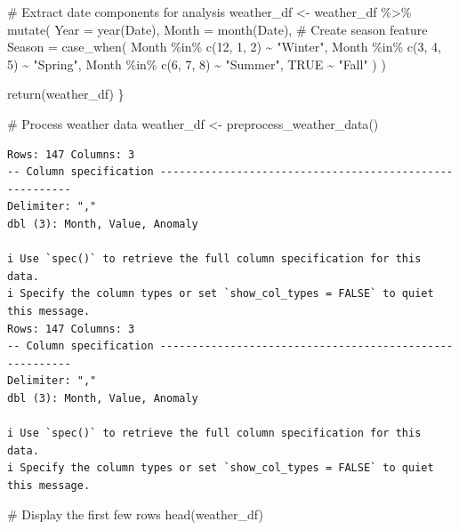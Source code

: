 \documentclass[
  letterpaper,
  DIV=11,
  numbers=noendperiod]{scrreprt}
\newenvironment{Shaded}{\begin{snugshade}}{\end{snugshade}}
\newcommand{\AttributeTok}[1]{\textcolor[rgb]{0.40,0.45,0.13}{#1}}
\newcommand{\CommentTok}[1]{\textcolor[rgb]{0.37,0.37,0.37}{#1}}
\newcommand{\ConstantTok}[1]{\textcolor[rgb]{0.56,0.35,0.01}{#1}}
\newcommand{\DecValTok}[1]{\textcolor[rgb]{0.68,0.00,0.00}{#1}}
\newcommand{\FunctionTok}[1]{\textcolor[rgb]{0.28,0.35,0.67}{#1}}
\newcommand{\NormalTok}[1]{\textcolor[rgb]{0.00,0.23,0.31}{#1}}
\newcommand{\OtherTok}[1]{\textcolor[rgb]{0.00,0.23,0.31}{#1}}
\newcommand{\SpecialCharTok}[1]{\textcolor[rgb]{0.37,0.37,0.37}{#1}}
\newcommand{\StringTok}[1]{\textcolor[rgb]{0.13,0.47,0.30}{#1}}
\begin{document}
\begin{Shaded}
\begin{Highlighting}[]
  \CommentTok{\# Extract date components for analysis}
\NormalTok{  weather\_df }\OtherTok{\textless{}{-}}\NormalTok{ weather\_df }\SpecialCharTok{\%\textgreater{}\%}
    \FunctionTok{mutate}\NormalTok{(}
      \AttributeTok{Year =} \FunctionTok{year}\NormalTok{(Date),}
      \AttributeTok{Month =} \FunctionTok{month}\NormalTok{(Date),}
      \CommentTok{\# Create season feature}
      \AttributeTok{Season =} \FunctionTok{case\_when}\NormalTok{(}
\NormalTok{        Month }\SpecialCharTok{\%in\%} \FunctionTok{c}\NormalTok{(}\DecValTok{12}\NormalTok{, }\DecValTok{1}\NormalTok{, }\DecValTok{2}\NormalTok{) }\SpecialCharTok{\textasciitilde{}} \StringTok{"Winter"}\NormalTok{,}
\NormalTok{        Month }\SpecialCharTok{\%in\%} \FunctionTok{c}\NormalTok{(}\DecValTok{3}\NormalTok{, }\DecValTok{4}\NormalTok{, }\DecValTok{5}\NormalTok{) }\SpecialCharTok{\textasciitilde{}} \StringTok{"Spring"}\NormalTok{,}
\NormalTok{        Month }\SpecialCharTok{\%in\%} \FunctionTok{c}\NormalTok{(}\DecValTok{6}\NormalTok{, }\DecValTok{7}\NormalTok{, }\DecValTok{8}\NormalTok{) }\SpecialCharTok{\textasciitilde{}} \StringTok{"Summer"}\NormalTok{,}
        \ConstantTok{TRUE} \SpecialCharTok{\textasciitilde{}} \StringTok{"Fall"}
\NormalTok{      )}
\NormalTok{    )}
  
  \FunctionTok{return}\NormalTok{(weather\_df)}
\NormalTok{\}}

\CommentTok{\# Process weather data}
\NormalTok{weather\_df }\OtherTok{\textless{}{-}} \FunctionTok{preprocess\_weather\_data}\NormalTok{()}
\end{Highlighting}
\end{Shaded}

\begin{verbatim}
Rows: 147 Columns: 3
-- Column specification --------------------------------------------------------
Delimiter: ","
dbl (3): Month, Value, Anomaly

i Use `spec()` to retrieve the full column specification for this data.
i Specify the column types or set `show_col_types = FALSE` to quiet this message.
Rows: 147 Columns: 3
-- Column specification --------------------------------------------------------
Delimiter: ","
dbl (3): Month, Value, Anomaly

i Use `spec()` to retrieve the full column specification for this data.
i Specify the column types or set `show_col_types = FALSE` to quiet this message.
\end{verbatim}

\begin{Shaded}
\begin{Highlighting}[]
\CommentTok{\# Display the first few rows}
\FunctionTok{head}\NormalTok{(weather\_df)}
\end{Highlighting}
\end{Shaded}
\end{document}
